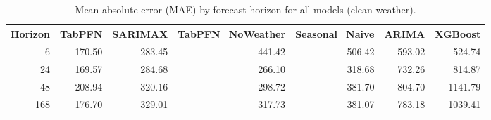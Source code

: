 \begin{table}[ht!]
\centering
\begin{tabular}{rrrrrrr}
\toprule
Horizon & TabPFN & SARIMAX & TabPFN_NoWeather & Seasonal_Naive & ARIMA & XGBoost \\
\midrule
6 & 170.50 & 283.45 & 441.42 & 506.42 & 593.02 & 524.74 \\
24 & 169.57 & 284.68 & 266.10 & 318.68 & 732.26 & 814.87 \\
48 & 208.94 & 320.16 & 298.72 & 381.70 & 804.70 & 1141.79 \\
168 & 176.70 & 329.01 & 317.73 & 381.07 & 783.18 & 1039.41 \\
\bottomrule
\end{tabular}
\caption{Mean absolute error (MAE) by forecast horizon for all models (clean weather).}
\label{tab:mae_by_horizon}
\end{table}
